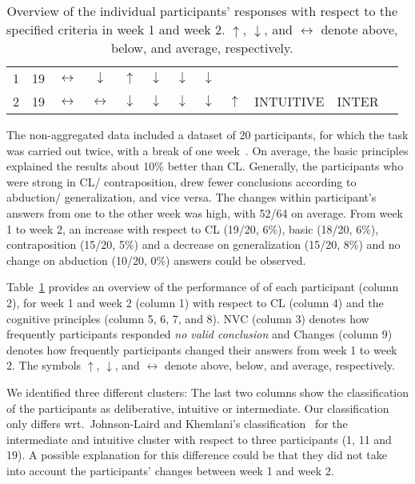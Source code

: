 \documentclass[12pt]{article}
\begin{document}
\begin{table}[htp]
\begin{tabular}{cccccccccccc}
1&19&$\leftrightarrow$&$\downarrow$&$\uparrow$&$\downarrow$&$\downarrow$&$\downarrow$ &&&\\
2&19&$\leftrightarrow$&$\leftrightarrow$&$\downarrow$&$\downarrow$&$\downarrow$&$\downarrow$ &\multirow{-2}{*}{$\uparrow$}& \multirow{-2}{*}{INTUITIVE}& \multirow{-2}{*}{INTER}\\ \bottomrule
\end{tabular}
\caption{Overview of the individual participants' responses with respect to the specified criteria in week 1 and week 2.
$\uparrow$, $\downarrow$, and $\leftrightarrow$ denote above, below, and average, respectively.
\label{tab:individual}}
\end{table}

The non-aggregated data included a dataset of 20 participants,
for which the task was carried out twice, with a break of one week~\cite{khemlani:2016}. On average, the basic principles explained the results about 10\;\% better than CL.
 Generally, the participants who were strong in CL/ contraposition, drew fewer conclusions according to abduction/ generalization, and vice versa.
 The changes within participant's answers from one to the other week was high, with 52/64 on average. 
 From week 1 to week 2, an increase with respect to CL (19/20, 6\;\%), basic (18/20, 6\;\%), contraposition (15/20, 5\;\%)
 and a decrease on generalization (15/20, 8\;\%) and no change on abduction (10/20, 0\;\%) answers could be observed.

Table~\ref{tab:individual} provides an overview of the performance of of each participant (column 2), for week 1 and week 2 (column 1)
with respect to CL (column 4) and the cognitive principles (column 5, 6, 7, and 8).
NVC (column 3) denotes how frequently participants responded \textit{no valid conclusion} and Changes (column 9) denotes how
frequently participants changed their answers from week 1 to week 2. 
The symbols $\uparrow$, $\downarrow$, and $\leftrightarrow$ denote above, below, and average, respectively.

We identified three different clusters: 
The last two columns show the classification of the participants as deliberative, intuitive or intermediate. 
Our classification only differs wrt.\ Johnson-Laird and Khemlani's 
classification~\cite{khemlani:2016} for the intermediate and intuitive cluster with respect to three participants (1, 11 and 19).
A possible explanation for this difference could be that they
did not take into account the participants' changes between week 1 and week 2.
\end{document}
